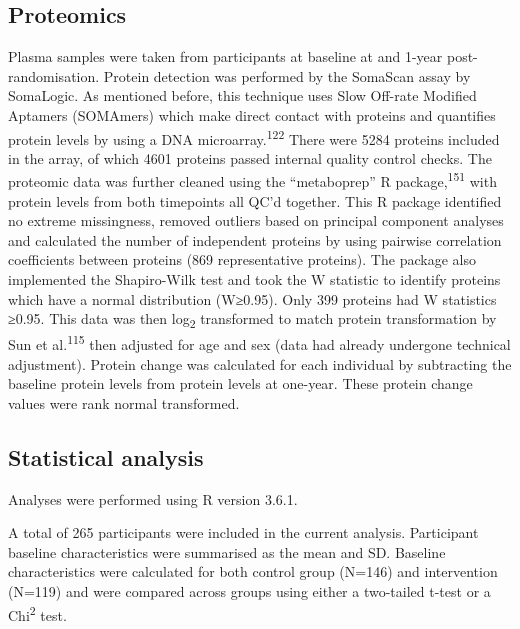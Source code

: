 \documentclass[11pt,twoside]{bristolthesis}
\begin{document}
\hypertarget{proteomics}{%
\subsection{Proteomics}\label{proteomics}}

Plasma samples were taken from participants at baseline at and 1-year post-randomisation. Protein detection was performed by the SomaScan assay by SomaLogic. As mentioned before, this technique uses Slow Off-rate Modified Aptamers (SOMAmers) which make direct contact with proteins and quantifies protein levels by using a DNA microarray.\textsuperscript{122} There were 5284 proteins included in the array, of which 4601 proteins passed internal quality control checks. The proteomic data was further cleaned using the ``metaboprep'' R package,\textsuperscript{151} with protein levels from both timepoints all QC'd together. This R package identified no extreme missingness, removed outliers based on principal component analyses and calculated the number of independent proteins by using pairwise correlation coefficients between proteins (869 representative proteins). The package also implemented the Shapiro-Wilk test and took the W statistic to identify proteins which have a normal distribution (W≥0.95). Only 399 proteins had W statistics ≥0.95. This data was then log\textsubscript{2} transformed to match protein transformation by Sun et al.\textsuperscript{115} then adjusted for age and sex (data had already undergone technical adjustment). Protein change was calculated for each individual by subtracting the baseline protein levels from protein levels at one-year. These protein change values were rank normal transformed.

\hypertarget{statistical-analysis-2}{%
\subsection{Statistical analysis}\label{statistical-analysis-2}}

Analyses were performed using R version 3.6.1.

A total of 265 participants were included in the current analysis. Participant baseline characteristics were summarised as the mean and SD. Baseline characteristics were calculated for both control group (N=146) and intervention (N=119) and were compared across groups using either a two-tailed t-test or a Chi\textsuperscript{2} test.
\end{document}
